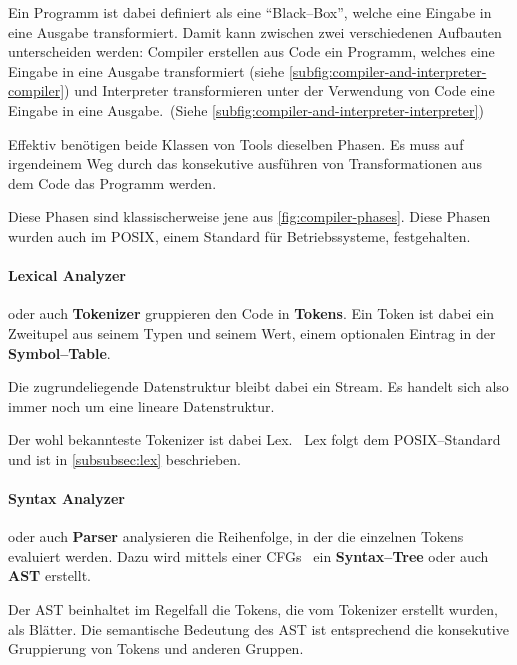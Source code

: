 Ein Programm ist dabei definiert als eine \enquote{Black--Box}, welche eine Eingabe in eine Ausgabe transformiert.
Damit kann zwischen zwei verschiedenen Aufbauten unterscheiden werden: Compiler erstellen aus Code ein Programm, welches eine Eingabe in eine Ausgabe transformiert (siehe \autoref{subfig:compiler-and-interpreter-compiler}) und Interpreter transformieren unter der Verwendung von Code eine Eingabe in eine Ausgabe.~(Siehe \autoref{subfig:compiler-and-interpreter-interpreter})

Effektiv benötigen beide Klassen von Tools dieselben Phasen.
Es muss auf irgendeinem Weg durch das konsekutive ausführen von Transformationen aus dem Code das Programm werden.

Diese Phasen sind klassischerweise jene aus \autoref{fig:compiler-phases}.
Diese Phasen wurden auch im \ac{POSIX}, einem Standard für Betriebssysteme, festgehalten.~\autocite{ieee-sa-1993}

\paragraph{Lexical Analyzer} oder auch \textbf{Tokenizer} gruppieren den Code in \textbf{Tokens}.
Ein Token ist dabei ein Zweitupel aus seinem Typen und seinem Wert, einem optionalen Eintrag in der \textbf{Symbol--Table}.~\autocite{aho-2006}

Die zugrundeliegende Datenstruktur bleibt dabei ein Stream.
Es handelt sich also immer noch um eine lineare Datenstruktur.

Der wohl bekannteste Tokenizer ist dabei Lex.~\autocite{debray-no-date}
Lex folgt dem \acs{POSIX}--Standard und ist in \autoref{subsubsec:lex} beschrieben.

\paragraph{Syntax Analyzer} oder auch \textbf{Parser} analysieren die Reihenfolge, in der die einzelnen Tokens evaluiert werden.
Dazu wird mittels einer \acp{CFG}~\autocite{sipser-1997} ein \textbf{Syntax--Tree} oder auch \textbf{\ac{AST}} erstellt.

Der \ac{AST} beinhaltet im Regelfall die Tokens, die vom Tokenizer erstellt wurden, als Blätter.
Die semantische Bedeutung des \ac{AST} ist entsprechend die konsekutive Gruppierung von Tokens und anderen Gruppen.

